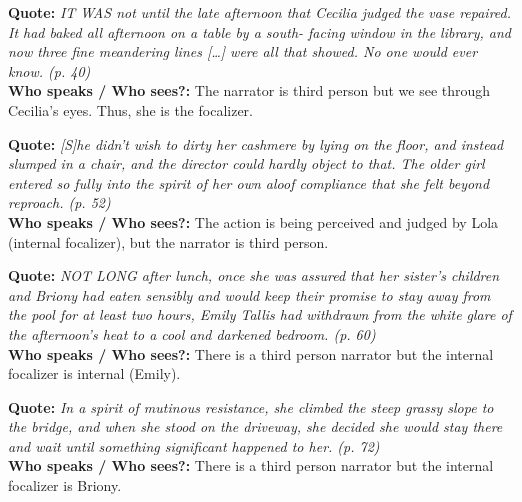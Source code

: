 \documentclass[a4paper]{article}
\newcommand*\circled[1]{\tikz[baseline=(char.base)]{
            \node[shape=circle,draw,inner sep=2pt] (char) {#1};}}
\newcommand\hr{\par\vspace{-.5\ht\strutbox}\noindent\hrulefill\par}
\begin{document}
\begin{minipage}[l]{0.05\textwidth}
    \circled{1}
\end{minipage}
\begin{minipage}[r]{0.95\textwidth}
    \textbf{Quote:} \textit{
        IT WAS not until the late afternoon that
        Cecilia judged the vase repaired. It had
        baked all afternoon on a table by a south-
        facing window in the library, and now three
        fine meandering lines […] were all that
        showed. No one would ever know. (p. 40)
    }
    \\
    \textbf{Who speaks / Who sees?:}
    The narrator is third person but we see through Cecilia's eyes.
    Thus, she is the focalizer.
\end{minipage}
\hr
\begin{minipage}[l]{0.05\textwidth}
    \circled{2}
\end{minipage}
\begin{minipage}[r]{0.95\textwidth}
    \textbf{Quote:} \textit{
        [S]he didn't wish to dirty her cashmere by
        lying on the floor, and instead slumped in a
        chair, and the director could hardly object to
        that. The older girl entered so fully into the
        spirit of her own aloof compliance that she
        felt beyond reproach. (p. 52)
    }
    \\
    \textbf{Who speaks / Who sees?:}
    The action is being perceived and judged by Lola (internal focalizer),
    but the narrator is third person.
\end{minipage}
\hr
\begin{minipage}[l]{0.05\textwidth}
    \circled{3}
\end{minipage}
\begin{minipage}[r]{0.95\textwidth}
    \textbf{Quote:} \textit{
        NOT LONG after lunch, once she was assured
        that her sister's children and Briony had
        eaten sensibly and would keep their promise
        to stay away from the pool for at least two
        hours, Emily Tallis had withdrawn from the
        white glare of the afternoon's heat to a cool
        and darkened bedroom. (p. 60)
    }
    \\
    \textbf{Who speaks / Who sees?:}
    There is a third person narrator but the internal focalizer is
    internal (Emily).
\end{minipage}
\hr
\begin{minipage}[l]{0.05\textwidth}
    \circled{4}
\end{minipage}
\begin{minipage}[r]{0.95\textwidth}
    \textbf{Quote:} \textit{
        In a spirit of mutinous resistance, she
        climbed the steep grassy slope to the bridge,
        and when she stood on the driveway, she
        decided she would stay there and wait until
        something significant happened to her. (p.
        72)
    }
    \\
    \textbf{Who speaks / Who sees?:}
    There is a third person narrator but the internal focalizer is Briony.
\end{minipage}
\end{document}
